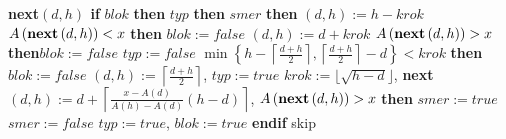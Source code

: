 {\bf next$\left(d,h\right)$\newline 
if} $blok$ {\bf then}\newline 
\phantom{---}{\bf if} $typ$ {\bf then}\newline 
\phantom{------}{\bf if} $smer$ {\bf then}\newline 
\phantom{---------}{\bf next}$\left(d,h\right):=h-krok$\newline 
\phantom{---------}{\bf if} $A\left(\text{{\bf next}}\left(d,h\right)\right)<x$ {\bf then}\newline
\phantom{------------}$blok:=false$\newline 
\phantom{---------}{\bf endif}\newline 
\phantom{------}{\bf else}\newline 
\phantom{---------}{\bf next}$\left(d,h\right):=d+krok$\newline 
\phantom{---------}{\bf if} $A\left(\text{{\bf next}}\left(d,h\right)\right)>x$ {\bf then}\newline \phantom{------------}$blok:=false$\newline 
\phantom{---------}{\bf endif}\newline 
\phantom{------}{\bf endif}\newline 
\phantom{------}$typ:=false$\newline 
\phantom{---}{\bf else}\newline 
\phantom{------}{\bf if} $\min\left\{h-\left\lceil\frac {d+h}2\right\rceil ,\left\lceil\frac {d+h}2\right\rceil-d\right\}<krok$ {\bf then}\newline 
\phantom{---------}$blok:=false$\newline 
\phantom{------}{\bf endif}\newline 
\phantom{------}{\bf next}$\left(d,h\right):=\left\lceil\frac {d+h}2\right\rceil$, $typ:=true$\newline 
\phantom{---}{\bf endif\newline 
else}\newline 
\phantom{---}$krok:=\lfloor\sqrt {h-d}\rfloor$, 
{\bf next$\left(d,h\right):=d+\left\lceil\frac {x-A\left(d\right)}{A\left(h\right)-A\left(d\right)}\left(h-d\right)\right\rceil$},\newline 
\phantom{---}{\bf if} $A\left(\text{{\bf next}}\left(d,h\right)\right)>x$ {\bf then}\newline 
\phantom{------}$smer:=true$\newline 
\phantom{---}{\bf else}\newline 
\phantom{------}$smer:=false$\newline 
\phantom{---}{\bf endif}\newline 
\phantom{---}$typ:=true$, $blok:=true$\newline 
{\bf endif}
skip

